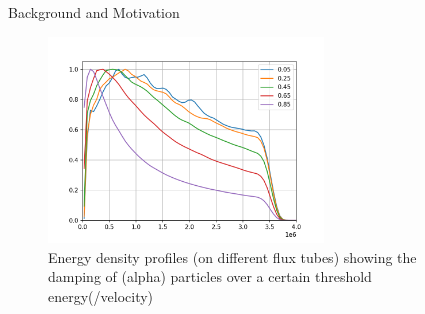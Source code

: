     \begin{frame}{Background and Motivation}    
        \begin{figure}
            \centering
            \includegraphics[width = 0.65\textwidth]{1 - background and motivation/images/Experimental Damped Distributions.png}
            \caption{Energy density profiles (on different flux tubes) showing the damping of (alpha) particles over a certain threshold energy(/velocity)}
        \end{figure}
    \end{frame}
    
